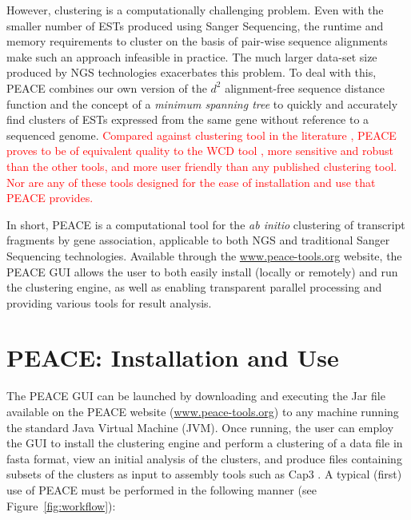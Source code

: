 \documentclass[a4,center,fleqn]{NAR}
\newcommand{\mc}[1]{\textcolor{red}{#1}}
\newcommand{\peace} {{\small PEACE}}
\newcommand{\wcd} {{\small WCD}}
\newcommand{\capthree} {{\small Cap3}}
\begin{document}
However, clustering is a computationally challenging problem.  Even
with the smaller number of ESTs produced using Sanger Sequencing, the
runtime and memory requirements to cluster on the basis of pair-wise
sequence alignments make such an approach infeasible in practice.  The
much larger data-set size produced by NGS technologies exacerbates
this problem.  To deal with this, \peace\/ combines our own version of
the $d^2$ alignment-free sequence distance function \cite{Hide94} and
the concept of a {\it minimum spanning tree} \cite{Prim57} to quickly
and accurately find clusters of ESTs expressed from the same gene
without reference to a sequenced genome.  \mc{Compared against
  clustering tool in the literature
  \cite{Burke99,Slater00,Huang99,Parkinson02,Kalyanaraman03,Malde03,
    Pertea2003,Ptitsyn05,Hazelhurst08a,Picardi09}, \peace\/ proves to be of
  equivalent quality to the \wcd\/ tool \cite{Hazelhurst08a}, more
  sensitive and robust than the other tools, and more user friendly
  than any published clustering tool.  Nor are any of} \mc{these tools
  designed for the ease of installation and use that \peace\/
  provides.}

In short, \peace\/ is a computational tool for the {\it ab initio}
clustering of transcript fragments by gene association, applicable to
both NGS and traditional Sanger Sequencing technologies.  Available
through the \href{http://www.peace-tools.org}{www.peace-tools.org}
website, the \peace\/ GUI allows the user to both easily install
(locally or remotely) and run the clustering engine, as well as
enabling transparent parallel processing and providing various tools
for result analysis.

\section{\peace: Installation and Use}

The \peace\/ GUI can be launched by downloading and executing the
Jar file available on the \peace\/ website
(\href{http://www.peace-tools.org}{www.peace-tools.org}) to any
machine running the standard Java Virtual Machine (JVM).  Once
running, the user can employ the GUI to install the clustering engine
and perform a clustering of a data file in {\sc fasta} format, view an
initial analysis of the clusters, and produce files containing subsets
of the clusters as input to assembly tools such as \capthree\/ 
\cite{Huang99}.  A typical (first) use of \peace\/ must be
performed in the following manner (see Figure~\ref{fig:workflow}):
\end{document}
